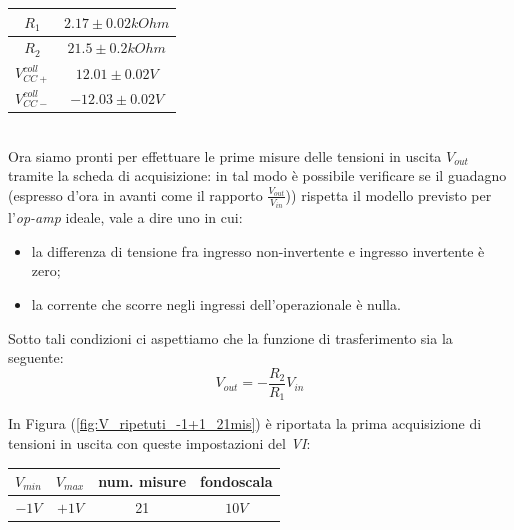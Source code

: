 \documentclass[journal, a4paper]{IEEEtran}
\begin{document}
\begin{tabular}{|c|c|}
\hline $R_1$ & $2.17 \pm 0.02 \si{kOhm} $\\ 
\hline $R_2$ & $21.5 \pm 0.2 \si{kOhm} $\\ 
\hline $V_{CC+}^{coll} $ &  $12.01 \pm 0.02 \si{V}$ \\ 
\hline $V_{CC-}^{coll} $ & $-12.03 \pm 0.02 \si{V}$ \\ 
\hline 
\end{tabular} \\


Ora siamo pronti per effettuare le prime misure delle tensioni in uscita $V_{out}$ tramite la scheda di acquisizione: in tal modo è possibile verificare se il guadagno (espresso d'ora in avanti come il rapporto $ \frac{V_{out}}{V_{in}} $)) rispetta il modello previsto per l'\textit{op-amp} ideale, vale a dire uno in cui:\\

\begin{itemize}
\item la differenza di tensione fra ingresso non-invertente e ingresso invertente è zero;
\item la corrente che scorre negli ingressi dell'operazionale è nulla.
\end{itemize}

Sotto tali condizioni ci aspettiamo che la funzione di trasferimento sia la seguente:\\

\begin{equation}
V_{out} = -\frac{R_2}{R_1}V_{in}
\end{equation}

In Figura (\ref{fig:V_ripetuti_-1+1_21mis}) è riportata la prima acquisizione di tensioni in uscita con queste impostazioni del \textit{VI}:\\

\begin{tabular}{|c|c|c|c|}
\hline $V_{min}$ & $V_{max} $ & \textbf{num. misure} & \textbf{fondoscala} \\ 
\hline $-1 \si{V} $ & $+1 \si{V} $ & 21 & $10 \si{V} $ \\ 
\hline 
\end{tabular} 
\end{document}
